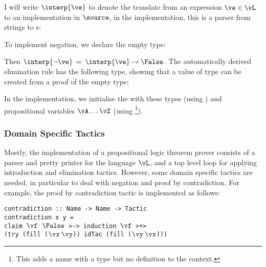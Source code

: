 I will write $\interp{\ve}$ to denote the translate from an expression
$\ve\in\vL$ to an implementation in $\source$, in the implementation,
this is a parser from strings to s:


To implement negation, we declare the empty type:

\DM{
\Data\:\False\Hab\Type\:=
}

Then $\interp{\neg\ve}\:=\:\interp{\ve}\to\False$. The automatically
derived elimination rule has the following type, showing that a value
of  type can be created from a proof of the empty type:

\DM{
\Elim{\False}\Hab\fbind{\vx}{\False}{
\fbind{\motive}{\False\to\Type}{\motive\:\vx}}
}

In the implementation, we initialise the  with these
types (using ) and propositional variables
$\vA\ldots\vZ$ (using \footnote{This adds a name with
  a type but no definition to the context.}).

\subsubsection{Domain Specific Tactics}

Mostly, the implementation of a propositional logic theorem prover
consists of a parser and pretty printer for the language $\vL$, and a
top level loop for applying introduction and elimination
tactics. However, some domain
specific tactics are needed, in particular to deal with negation and
proof by contradiction. For example, the proof by contradiction tactic
is implemented as follows:

\texttt{contradiction :: Name -> Name -> Tactic}\\
\texttt{contradiction x y =}\\
\hspace*{0.5in}\texttt{claim $\vf$ $\False$ >-> induction $\vf$ >+>}\\
\hspace*{0.7in}\texttt{(try (fill ($\vx\:\vy$)) idTac (fill ($\vy\:\vx$)))}\\

